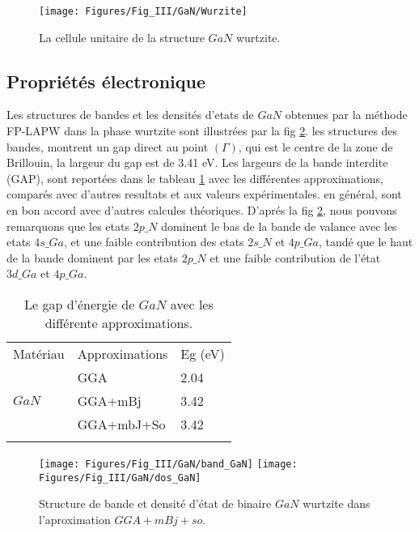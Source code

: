 \begin{figure}
	\centering
	\texttt{[image: Figures/Fig\_III/GaN/Wurzite]}
	\caption{La cellule unitaire de la structure $ GaN $ wurtzite.}
	\label{fig:wurzite}
\end{figure}
\FloatBarrier

\subsection{Propriétés électronique}

Les structures de bandes et les densités d'etats de $ GaN $ obtenues par la méthode FP-LAPW dans la phase wurtzite sont illustrées par la fig \ref{fig:band_GaN}. les structures des bandes, montrent un gap direct au point $ (\Gamma) $, qui est le centre de la zone de Brillouin, la largeur du gap est de 3.41 eV. Les largeurs de  la bande interdite (GAP), sont reportées dans le tableau \ref{tab_GaN} avec les différentes approximations, comparés avec d'autres resultats et aux valeurs expérimentales. en général, sont en bon accord avec d'autres calcules théoriques. D'aprés la fig \ref{fig:band_GaN}, nous pouvons remarquons que les etats $ 2p\_N $ dominent le bas de la bande de valance avec les etats $ 4s\_Ga $, et une faible contribution des etats $ 2s\_N $ et $ 4p\_Ga $, tandé que le haut de la bande dominent par les etats $ 2p\_N $ et une faible contribution de l'état $ 3d\_Ga $ et $ 4p\_Ga $.

\begin{table}[h!]
	\centering
	\begin{tabular}{lll}
		\hline\noalign{\smallskip}
		Matériau & Approximations & Eg (eV)  \\
		\noalign{\smallskip}\hline\noalign{\smallskip}
		& GGA & 2.04 \\
		$ GaN $ & GGA+mBj & 3.42 \\
		& GGA+mbJ+So & 3.42 \\
		\noalign{\smallskip}\hline
	\end{tabular}
	\caption{Le gap d'énergie de $ GaN $ avec les  différente  approximations.}
	\label{tab_GaN}
\end{table}

\begin{figure}
	\centering
	\texttt{[image: Figures/Fig\_III/GaN/band\_GaN]}
	\texttt{[image: Figures/Fig\_III/GaN/dos\_GaN]}
	\caption{Structure de bande et densité d'état de binaire $ GaN $ wurtzite dans l'aproximation $ GGA+mBj+so $.}
	\label{fig:band_GaN}
\end{figure}
\FloatBarrier

